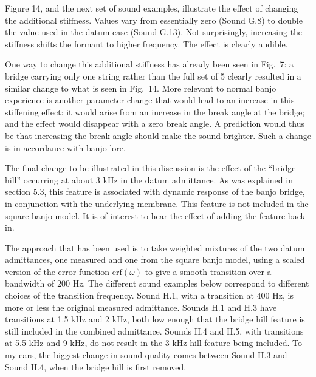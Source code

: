 
  Figure 14, and the next set of sound examples, illustrate the effect of 
  changing the additional stiffness. Values vary from essentially zero (Sound 
  G.8) to double the value used in the datum case (Sound G.13). Not 
  surprisingly, increasing the stiffness shifts the formant to higher 
  frequency. The effect is clearly audible. 


  One way to change this additional stiffness has already been seen in Fig.\ 7: 
  a bridge carrying only one string rather than the full set of 5 clearly 
  resulted in a similar change to what is seen in Fig.\ 14. More relevant to 
  normal banjo experience is another parameter change that would lead to an 
  increase in this stiffening effect: it would arise from an increase in the 
  break angle at the bridge; and the effect would disappear with a zero break 
  angle. A prediction would thus be that increasing the break angle should make 
  the sound brighter. Such a change is in accordance with banjo lore. 


  The final change to be illustrated in this discussion is the effect of the 
  ``bridge hill'' occurring at about 3 kHz in the datum admittance. As was 
  explained in section 5.3, this feature is associated with dynamic response of 
  the banjo bridge, in conjunction with the underlying membrane. This feature 
  is not included in the square banjo model. It is of interest to hear the 
  effect of adding the feature back in. 

  The approach that has been used is to take weighted mixtures of the two datum 
  admittances, one measured and one from the square banjo model, using a scaled 
  version of the error function $\mathrm{erf}(\omega)$ to give a smooth 
  transition over a bandwidth of 200 Hz. The different sound examples below 
  correspond to different choices of the transition frequency. Sound H.1, with 
  a transition at 400 Hz, is more or less the original measured admittance. 
  Sounds H.1 and H.3 have transitions at 1.5 kHz and 2 kHz, both low enough 
  that the bridge hill feature is still included in the combined admittance. 
  Sounds H.4 and H.5, with transitions at 5.5 kHz and 9 kHz, do not result in 
  the 3 kHz hill feature being included. To my ears, the biggest change in 
  sound quality comes between Sound H.3 and Sound H.4, when the bridge hill is 
  first removed. 

